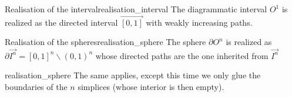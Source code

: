 \begin{ccor}{Realisation of the interval}{realisation_interval}
    The diagrammatic interval \( O^1 \) is realized as the directed interval \( \vec{[0, 1]} \) with weakly increasing paths.
\end{ccor}

\begin{ccor}{Realisation of the spheres}{realisation_sphere}
    The sphere \( \partial O^n \) is realized as \( \partial \vec {I^n} = [0, 1]^n \backslash (0, 1)^n \) whose directed paths are the one inherited from \( \vec {I^n} \)
\end{ccor}
\begin{corproof}{realisation_sphere}
    The same applies, except this time we only glue the boundaries of the \( n \) simplices (whose interior is then empty).
\end{corproof}



    
